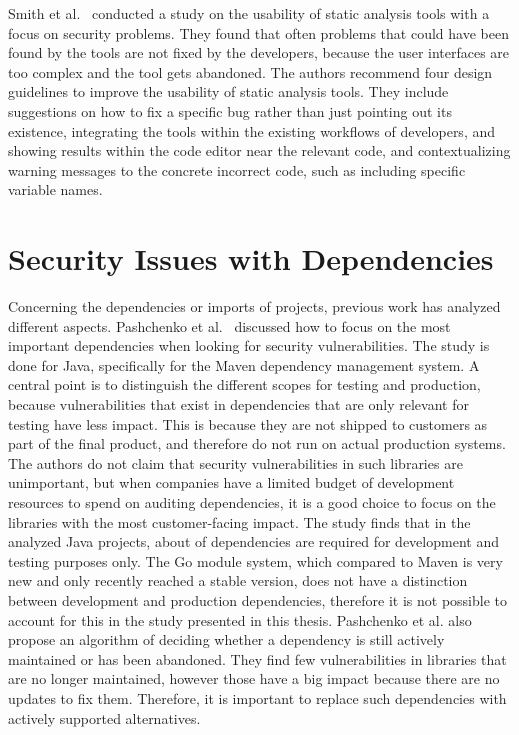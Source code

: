 Smith et al.~\cite{smith2020} conducted a study on the usability of static analysis tools with a focus on security
problems.
They found that often problems that could have been found by the tools are not fixed by the developers, because the user
interfaces are too complex and the tool gets abandoned.
The authors recommend four design guidelines to improve the usability of static analysis tools.
They include suggestions on how to fix a specific bug rather than just pointing out its existence, integrating the tools
within the existing workflows of developers, and showing results within the code editor near the relevant code,
and contextualizing warning messages to the concrete incorrect code, such as including specific variable names.



\section{Security Issues with Dependencies}\label{sec:related-work:dependency-issues}

Concerning the dependencies or imports of projects, previous work has analyzed different aspects.
Pashchenko et al.~\cite{pashchenko2018} discussed how to focus on the most important dependencies when looking for
security vulnerabilities.
The study is done for Java, specifically for the Maven dependency management system.
A central point is to distinguish the different scopes for testing and production, because vulnerabilities that exist in
dependencies that are only relevant for testing have less impact.
This is because they are not shipped to customers as part of the final product, and therefore do not run on actual
production systems.
The authors do not claim that security vulnerabilities in such libraries are unimportant, but when companies have a
limited budget of development resources to spend on auditing dependencies, it is a good choice to focus on the libraries
with the most customer-facing impact.
The study finds that in the analyzed Java projects, about  of dependencies are required for development
and testing purposes only.
The Go module system, which compared to Maven is very new and only recently reached a stable version, does not have a
distinction between development and production dependencies, therefore it is not possible to account for this in the
study presented in this thesis.
Pashchenko et al. also propose an algorithm of deciding whether a dependency is still actively maintained or has been
abandoned.
They find few vulnerabilities in libraries that are no longer maintained, however those have a big impact because there
are no updates to fix them.
Therefore, it is important to replace such dependencies with actively supported alternatives.

